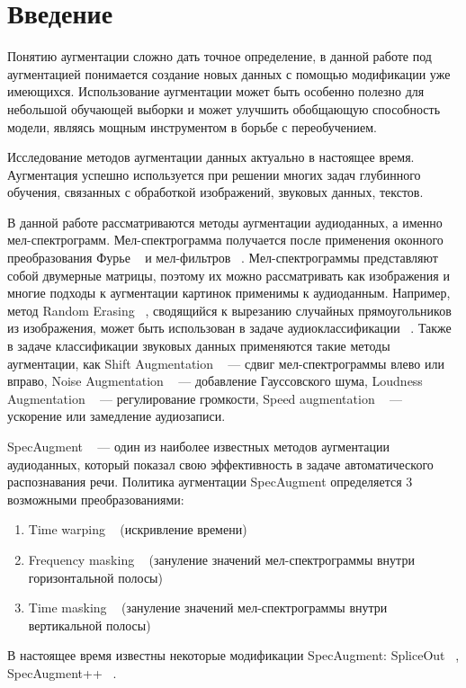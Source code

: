 \documentclass[12pt, fleqn]{article}
\begin{document}
\newpage


\section{Введение}

Понятию аугментации сложно дать точное определение, в данной работе под аугментацией понимается создание новых данных с помощью модификации уже имеющихся. Использование аугментации может быть особенно полезно для небольшой обучающей выборки и может улучшить обобщающую способность модели, являясь мощным инструментом в борьбе с переобучением. 

Исследование методов аугментации данных актуально в настоящее время. Аугментация успешно используется при решении многих задач глубинного обучения, связанных с обработкой изображений, звуковых данных, текстов.

В данной работе рассматриваются методы аугментации аудиоданных, а именно мел-спектрограмм. Мел-спектрограмма получается после применения оконного преобразования Фурье ~\cite{Fourier} и мел-фильтров ~\cite{MelScale}. Мел-спектрограммы представляют собой двумерные матрицы, поэтому их можно рассматривать как изображения и многие подходы к аугментации картинок применимы к аудиоданным. Например, метод Random Erasing ~\cite{RandomErasing}, сводящийся к вырезанию случайных прямоугольников из изображения, может быть использован в задаче аудиоклассификации  ~\cite{RandomErasingClassification}. Также в задаче классификации звуковых данных применяются такие методы аугментации, как Shift Augmentation ~\cite{AudioClassification} --- сдвиг мел-спектрограммы влево или вправо, Noise Augmentation ~\cite{AudioClassification} --- добавление Гауссовского шума, Loudness Augmentation ~\cite{AudioClassification} --- регулирование громкости, Speed augmentation ~\cite{AudioClassification} --- ускорение или замедление аудиозаписи.

SpecAugment ~\cite{SpecAugment} --- один из наиболее известных методов аугментации аудиоданных, который показал свою эффективность в задаче автоматического распознавания речи. Политика аугментации SpecAugment определяется 3 возможными преобразованиями: 
\begin{enumerate}
    \item Time warping ~\cite{SpecAugment} (искривление времени)
    \item Frequency masking ~\cite{SpecAugment} (зануление значений мел-спектрограммы внутри горизонтальной полосы)
    \item Time masking ~\cite{SpecAugment} (зануление значений мел-спектрограммы внутри вертикальной полосы)
\end{enumerate}
В настоящее время известны некоторые модификации SpecAugment: SpliceOut ~\cite{SpliceOut}, SpecAugment++ ~\cite{SpecAugment++}.
\end{document}
